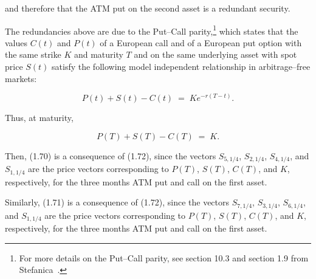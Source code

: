 and therefore that the ATM put on the second asset is a redundant
security.

The redundancies above are due to the Put--Call parity,\footnote{For more
details on the Put--Call parity, see section 10.3 and section 1.9 from
Stefanica~\cite{36}.} which states that the values $C(t)$ and $P(t)$ of a
European call and of a European put option with the same strike $K$ and
maturity $T$ and on the same underlying asset with spot price $S(t)$
satisfy the following model independent relationship in arbitrage--free
markets:

\[
P(t)+S(t)-C(t) \;=\; Ke^{-r(T-t)}.
\]

Thus, at maturity,

\begin{equation}
P(T)+S(T)-C(T) \;=\; K.
\end{equation}

Then, (1.70) is a consequence of (1.72), since the vectors $S_{5,1/4}$,
$S_{2,1/4}$, $S_{4,1/4}$, and $S_{1,1/4}$ are the price vectors
corresponding to $P(T)$, $S(T)$, $C(T)$, and $K$, respectively, for the
three months ATM put and call on the first asset.

Similarly, (1.71) is a consequence of (1.72), since the vectors
$S_{7,1/4}$, $S_{3,1/4}$, $S_{6,1/4}$, and $S_{1,1/4}$ are the price
vectors corresponding to $P(T)$, $S(T)$, $C(T)$, and $K$, respectively, for
the three months ATM put and call on the first asset.
